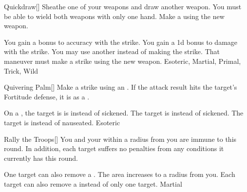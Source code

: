 \lowercase{\hypertarget{maneuver:Quickdraw}{}}\label{maneuver:Quickdraw}
\hypertarget{maneuver:Quickdraw}{}
\begin{freeability}{Quickdraw}[]
Sheathe one of your weapons and draw another weapon.
You must be able to wield both weapons with only one hand.
Make a  using the new weapon.

\rankline
{} You gain a  bonus to accuracy with the strike.
 You gain a \plus1d bonus to damage with the strike.
 You may use another  instead of making the strike.
That maneuver must make a strike using the new weapon.
 Esoteric, Martial, Primal, Trick, Wild
\end{freeability}
\vspace{0.25em}



\lowercase{\hypertarget{maneuver:Quivering Palm}{}}\label{maneuver:Quivering Palm}
\hypertarget{maneuver:Quivering Palm}{}
\begin{freeability}{Quivering Palm}[]
Make a strike using an .
If the attack result hits the target's Fortitude defense,
it is  as a .

\rankline
{} On a , the target is is  instead of sickened.
 The target is  instead of sickened.
 The target is  instead of nauseated.
 Esoteric
\end{freeability}
\vspace{0.25em}



\lowercase{\hypertarget{maneuver:Rally the Troops}{}}\label{maneuver:Rally the Troops}
\hypertarget{maneuver:Rally the Troops}{}
\begin{freeability}{Rally the Troops}[]
You and your  within a \areamed radius from you are immune to  this round.
In addition, each target suffers no penalties from any conditions it currently has this round.

\rankline
{} One target can also remove a .
 The area increases to a \arealarge radius from you.
 Each target can also remove a  instead of only one target.
 Martial
\end{freeability}
\vspace{0.25em}




